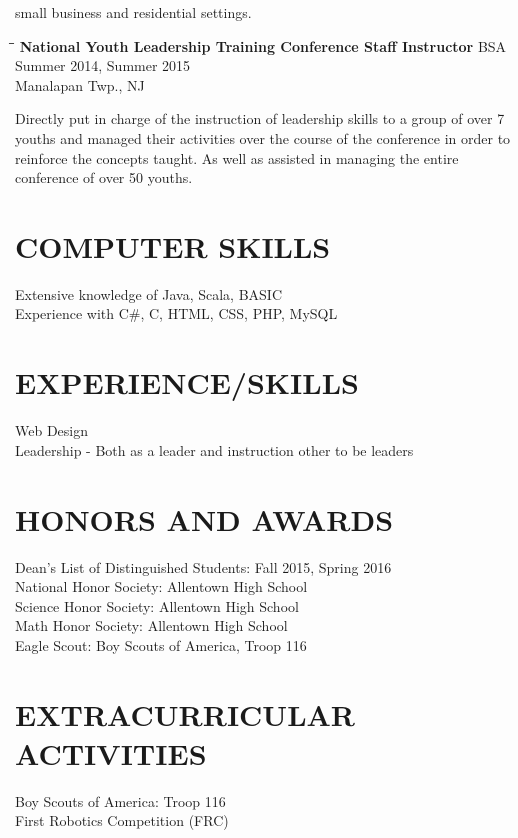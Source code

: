 \documentclass{res}
\begin{document}
\begin{resume}
    small business and residential settings.
    \vspace{-0.2in}
    \begin{tabbing}
   \hspace{2.3in}\= \hspace{2.2in}\= \hspace{.4in}\= \kill %
   {\bf National Youth Leadership Training Conference Staff Instructor}  \> \>BSA \> Summer 2014, Summer 2015\\
                          \>Manalapan Twp., NJ
   \end{tabbing}\vspace{-20pt}            %
    Directly put in charge of the instruction of leadership skills to a group of over 7 youths and managed their activities over the course of the conference in order to reinforce the concepts taught. As well as assisted in managing the entire conference of over 50 youths.
\vspace{-0.2in}
\section{COMPUTER SKILLS}          
    Extensive knowledge of Java, Scala, BASIC  \\ 
    Experience with C\#, C, HTML, CSS, PHP, MySQL
\vspace{-0.2in}
\section{EXPERIENCE/SKILLS}
    Web Design \\
    Leadership - Both as a leader and instruction other to be leaders
\vspace{-0.2in}
\section{HONORS AND AWARDS}          
    Dean's List of Distinguished Students: Fall 2015, Spring 2016  \\        
    National Honor Society: Allentown High School  \\        
    Science Honor Society: Allentown High School  \\       
    Math Honor Society: Allentown High School\\ 
    Eagle Scout: Boy Scouts of America, Troop 116
\vspace{-0.2in}
\section{EXTRACURRICULAR ACTIVITIES}          
    Boy Scouts of America: Troop 116 \\
    First Robotics Competition (FRC)
\end{resume}
\end{document}
